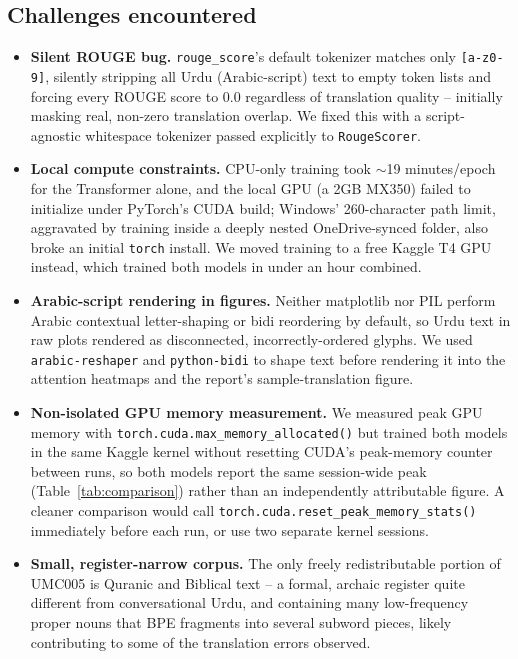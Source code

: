 \documentclass[conference]{IEEEtran}
\begin{document}
\subsection{Challenges encountered}
\begin{itemize}
\item \textbf{Silent ROUGE bug.} \texttt{rouge\_score}'s default tokenizer
matches only \texttt{[a-z0-9]}, silently stripping all Urdu (Arabic-script)
text to empty token lists and forcing every ROUGE score to 0.0 regardless
of translation quality -- initially masking real, non-zero translation
overlap. We fixed this with a script-agnostic whitespace tokenizer passed
explicitly to \texttt{RougeScorer}.
\item \textbf{Local compute constraints.} CPU-only training took
$\sim$19 minutes/epoch for the Transformer alone, and the local GPU
(a 2GB MX350) failed to initialize under PyTorch's CUDA build; Windows'
260-character path limit, aggravated by training inside a deeply nested
OneDrive-synced folder, also broke an initial \texttt{torch} install. We
moved training to a free Kaggle T4 GPU instead, which trained both models
in under an hour combined.
\item \textbf{Arabic-script rendering in figures.} Neither matplotlib nor
PIL perform Arabic contextual letter-shaping or bidi reordering by default,
so Urdu text in raw plots rendered as disconnected, incorrectly-ordered
glyphs. We used \texttt{arabic-reshaper} and \texttt{python-bidi} to shape
text before rendering it into the attention heatmaps and the report's
sample-translation figure.
\item \textbf{Non-isolated GPU memory measurement.} We measured peak GPU
memory with \texttt{torch.cuda.max\_memory\_allocated()} but trained both
models in the same Kaggle kernel without resetting CUDA's peak-memory
counter between runs, so both models report the same session-wide peak
(Table~\ref{tab:comparison}) rather than an independently attributable
figure. A cleaner comparison would call
\texttt{torch.cuda.reset\_peak\_memory\_stats()} immediately before each
run, or use two separate kernel sessions.
\item \textbf{Small, register-narrow corpus.} The only freely
redistributable portion of UMC005 is Quranic and Biblical text -- a formal,
archaic register quite different from conversational Urdu, and containing
many low-frequency proper nouns that BPE fragments into several subword
pieces, likely contributing to some of the translation errors observed.
\end{itemize}
\end{document}
